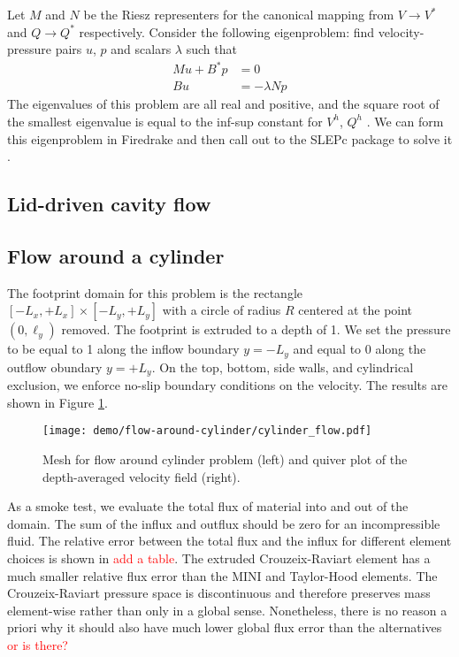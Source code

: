 \documentclass{article}
\theoremstyle{definition}
\theoremstyle{plain}
\begin{document}
Let $M$ and $N$ be the Riesz representers for the canonical mapping from $V \to V^*$ and $Q \to Q^*$ respectively.
Consider the following eigenproblem: find velocity-pressure pairs $u$, $p$ and scalars $\lambda$ such that
\begin{align}
    Mu + B^*p & = 0 \\
    Bu & = -\lambda Np
\end{align}
The eigenvalues of this problem are all real and positive, and the square root of the smallest eigenvalue is equal to the inf-sup constant for $V^h$, $Q^h$ \citep{malkus1981eigenproblems}.
We can form this eigenproblem in Firedrake and then call out to the SLEPc package to solve it \citep{hernandez2005slepc}.

\subsection{Lid-driven cavity flow}

\subsection{Flow around a cylinder}

The footprint domain for this problem is the rectangle $[-L_x, +L_x] \times [-L_y, +L_y]$ with a circle of radius $R$ centered at the point $(0, \ell_y)$ removed.
The footprint is extruded to a depth of 1.
We set the pressure to be equal to 1 along the inflow boundary $y = -L_y$ and equal to 0 along the outflow obundary $y = +L_y$.
On the top, bottom, side walls, and cylindrical exclusion, we enforce no-slip boundary conditions on the velocity.
The results are shown in Figure \ref{fig:cylinder-flow}.

\begin{figure}
    \begin{center}
        \texttt{[image: demo/flow-around-cylinder/cylinder\_flow.pdf]}
    \end{center}
    \caption{Mesh for flow around cylinder problem (left) and quiver plot of the depth-averaged velocity field (right).}
    \label{fig:cylinder-flow}
\end{figure}

As a smoke test, we evaluate the total flux of material into and out of the domain.
The sum of the influx and outflux should be zero for an incompressible fluid.
The relative error between the total flux and the influx for different element choices is shown in \textcolor{red}{add a table}.
The extruded Crouzeix-Raviart element has a much smaller relative flux error than the MINI and Taylor-Hood elements.
The Crouzeix-Raviart pressure space is discontinuous and therefore preserves mass element-wise rather than only in a global sense.
Nonetheless, there is no reason a priori why it should also have much lower global flux error than the alternatives \textcolor{red}{or is there?}
\end{document}
